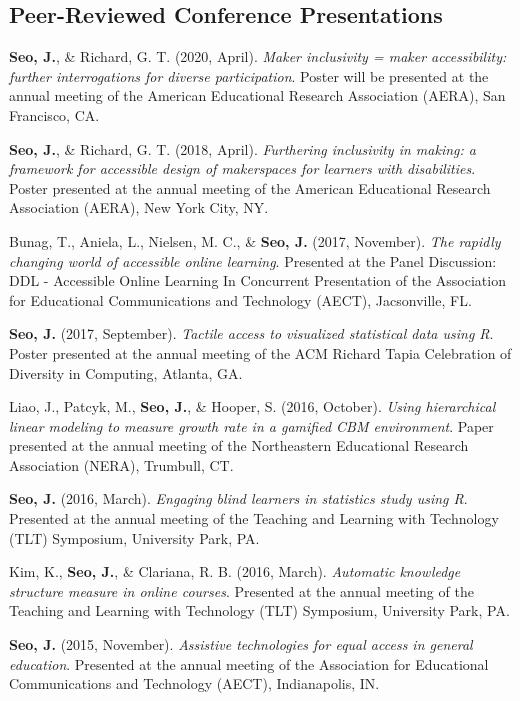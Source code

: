 \documentclass[11pt, a4paper]{awesome-cv}
\begin{document}
\hypertarget{peer-reviewed-conference-presentations}{%
\subsection{Peer-Reviewed Conference
Presentations}\label{peer-reviewed-conference-presentations}}

\begingroup
\setlength{\parindent}{-0.5in}
\setlength{\leftskip}{0.5in}

\textbf{Seo, J.}, \& Richard, G. T. (2020, April). \emph{Maker
inclusivity = maker accessibility: further interrogations for diverse
participation}. Poster will be presented at the annual meeting of the
American Educational Research Association (AERA), San Francisco, CA.

\textbf{Seo, J.}, \& Richard, G. T. (2018, April). \emph{Furthering
inclusivity in making: a framework for accessible design of makerspaces
for learners with disabilities}. Poster presented at the annual meeting
of the American Educational Research Association (AERA), New York City,
NY.

Bunag, T., Aniela, L., Nielsen, M. C., \& \textbf{Seo, J.} (2017,
November). \emph{The rapidly changing world of accessible online
learning}. Presented at the Panel Discussion: DDL - Accessible Online
Learning In Concurrent Presentation of the Association for Educational
Communications and Technology (AECT), Jacsonville, FL.

\textbf{Seo, J.} (2017, September). \emph{Tactile access to visualized
statistical data using R}. Poster presented at the annual meeting of the
ACM Richard Tapia Celebration of Diversity in Computing, Atlanta, GA.

Liao, J., Patcyk, M., \textbf{Seo, J.}, \& Hooper, S. (2016, October).
\emph{Using hierarchical linear modeling to measure growth rate in a
gamified CBM environment}. Paper presented at the annual meeting of the
Northeastern Educational Research Association (NERA), Trumbull, CT.

\textbf{Seo, J.} (2016, March). \emph{Engaging blind learners in
statistics study using R}. Presented at the annual meeting of the
Teaching and Learning with Technology (TLT) Symposium, University Park,
PA.

Kim, K., \textbf{Seo, J.}, \& Clariana, R. B. (2016, March).
\emph{Automatic knowledge structure measure in online courses}.
Presented at the annual meeting of the Teaching and Learning with
Technology (TLT) Symposium, University Park, PA.

\textbf{Seo, J.} (2015, November). \emph{Assistive technologies for
equal access in general education}. Presented at the annual meeting of
the Association for Educational Communications and Technology (AECT),
Indianapolis, IN.
\end{document}
